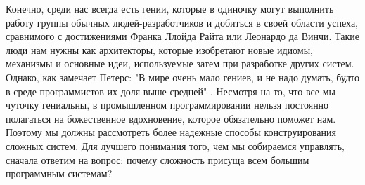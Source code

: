 \documentclass[11pt]{article}
\begin{document}
Конечно, среди нас всегда есть гении, которые в одиночку могут выполнить работу группы обычных людей-разработчиков и добиться в своей области успеха, сравнимого с достижениями Франка Ллойда Райта или Леонардо да Винчи. Такие люди нам нужны как архитекторы, которые изобретают новые идиомы, механизмы и основные идеи, используемые затем при разработке других систем. Однако, как замечает Петерс: "В мире очень мало гениев, и не надо думать, будто в среде программистов их доля выше средней" \cite[p.22]{2}. Несмотря на то, что все мы чуточку гениальны, в промышленном программировании нельзя постоянно полагаться на божественное вдохновение, которое обязательно поможет нам. Поэтому мы должны рассмотреть более надежные способы конструирования сложных систем. Для лучшего понимания того, чем мы собираемся управлять, сначала ответим на вопрос: почему сложность присуща всем большим программным системам? 
\end{document}
